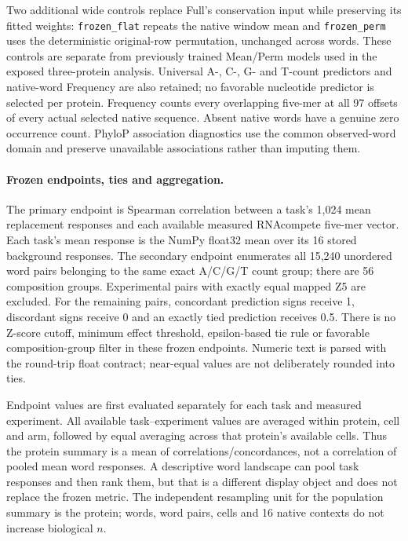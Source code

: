 \documentclass[11pt]{article}
\begin{document}
Two additional wide controls replace Full's conservation input while preserving its fitted weights: \texttt{frozen\_flat} repeats the native window mean and \texttt{frozen\_perm} uses the deterministic original-row permutation, unchanged across words. These controls are separate from previously trained Mean/Perm models used in the exposed three-protein analysis. Universal A-, C-, G- and T-count predictors and native-word Frequency are also retained; no favorable nucleotide predictor is selected per protein. Frequency counts every overlapping five-mer at all 97 offsets of every actual selected native sequence. Absent native words have a genuine zero occurrence count. PhyloP association diagnostics use the common observed-word domain and preserve unavailable associations rather than imputing them.

\paragraph{Frozen endpoints, ties and aggregation.}
The primary endpoint is Spearman correlation between a task's 1,024 mean replacement responses and each available measured RNAcompete five-mer vector. Each task's mean response is the NumPy float32 mean over its 16 stored background responses. The secondary endpoint enumerates all 15,240 unordered word pairs belonging to the same exact A/C/G/T count group; there are 56 composition groups. Experimental pairs with exactly equal mapped Z5 are excluded. For the remaining pairs, concordant prediction signs receive 1, discordant signs receive 0 and an exactly tied prediction receives 0.5. There is no Z-score cutoff, minimum effect threshold, epsilon-based tie rule or favorable composition-group filter in these frozen endpoints. Numeric text is parsed with the round-trip float contract; near-equal values are not deliberately rounded into ties.

Endpoint values are first evaluated separately for each task and measured experiment. All available task--experiment values are averaged within protein, cell and arm, followed by equal averaging across that protein's available cells. Thus the protein summary is a mean of correlations/concordances, not a correlation of pooled mean word responses. A descriptive word landscape can pool task responses and then rank them, but that is a different display object and does not replace the frozen metric. The independent resampling unit for the population summary is the protein; words, word pairs, cells and 16 native contexts do not increase biological \(n\).
\end{document}
